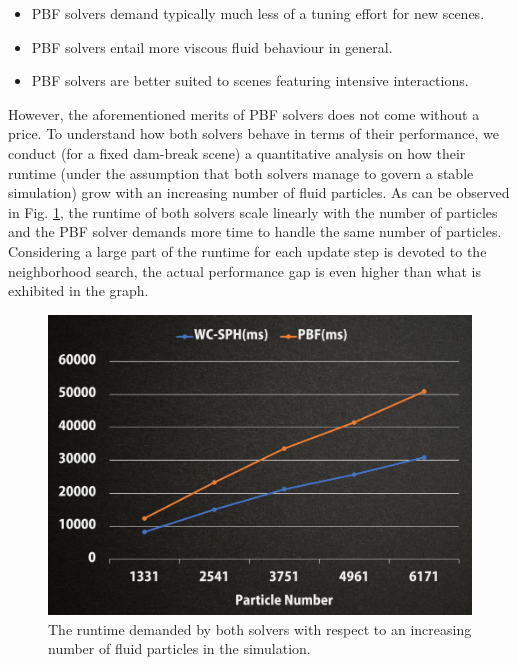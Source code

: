 \documentclass[
	11pt, 
	DIV10,
	ngerman,
	a4paper, 
	oneside, 
	headings=normal, 
	captions=tableheading,
	final, 
	numbers=noenddot
]{scrartcl}
\begin{document}
\begin{itemize}
    \item PBF solvers demand typically much less of a tuning effort for new scenes.
    \item PBF solvers entail more viscous fluid behaviour in general.
    \item PBF solvers are better suited to scenes featuring intensive interactions.
\end{itemize}

However, the aforementioned merits of PBF solvers does not come without a price. To understand how both solvers behave in terms of their performance, we conduct (for a fixed dam-break scene) a quantitative analysis on how their runtime (under the assumption that both solvers manage to govern a stable simulation) grow with an increasing number of fluid particles. As can be observed in Fig. \ref{fig:performance}, the runtime of both solvers scale linearly with the number of particles and the PBF solver demands more time to handle the same number of particles. Considering a large part of the runtime for each update step is devoted to the neighborhood search, the actual performance gap is even higher than what is exhibited in the graph.

\begin{figure}[h]
	\centering
    \includegraphics[width=.6\textwidth]{pics/performance.png}
    \caption{The runtime demanded by both solvers with respect to an increasing number of fluid particles in the simulation.}
    \label{fig:performance}
\end{figure}



\end{document}
